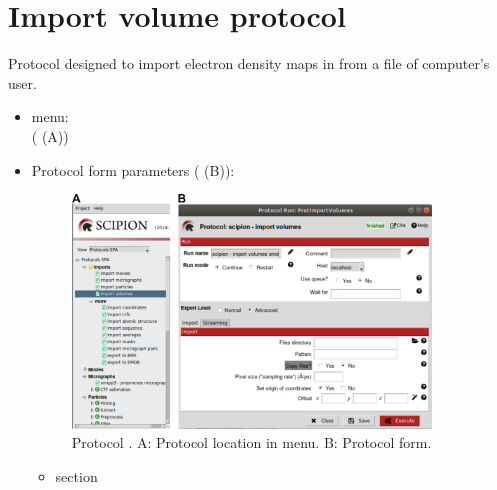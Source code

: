\section{Import volume protocol}
\label{app:importVolume}%
Protocol designed to import electron density maps in \scipion from a file of computer's user.
   
 \begin{itemize}
  \item \scipion menu:\\
   ( (A))\\
  
  \item Protocol form parameters ( (B)):\\
  
  \begin{figure}[H]
    \centering 
    \captionsetup{width=.7\linewidth} 
    \includegraphics[width=0.90\textwidth]{Images_appendix/Fig100.pdf}
    \caption{Protocol . A: Protocol location in \scipion menu. B: Protocol form.}
    \label{fig:app_protocol_volume_1}
   \end{figure}
  
  \begin{itemize}
   \item {} section\\
  


\end{itemize}
\end{itemize}
